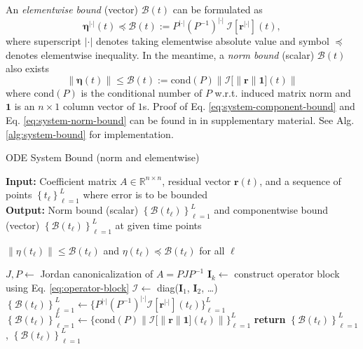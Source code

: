 \documentclass{uai2023}
\newcommand{\vect}[1]{\mathbf{#1}}
\newcommand{\Err}{\eta}
\newcommand{\Bound}{\mathcal{B}}
\newcommand{\I}{\mathcal{I}}
\newcommand{\abs}{|\cdot|}
\begin{document}
    An \textit{elementwise bound} (vector) $\pmb{\Bound}(t)$ can be formulated as 
    {
        \small
        \begin{equation}\label{eq:system-component-bound}
            \pmb{\Err}^{\abs}(t) \preceq \pmb{\Bound}(t) := P^{\abs} (P^{-1})^{\abs} \ \pmb{\I}\left[\vect{r}^{\abs}\right](t),
        \end{equation}
    }
    where superscript $\abs$ denotes taking elementwise absolute value and symbol $\preceq$ denotes elementwise inequality. In the meantime, a \textit{norm bound} (scalar) $\Bound(t)$ also exists
    {
        \small
        \begin{equation}\label{eq:system-norm-bound}
            \left\|\pmb{\Err}(t)\right\| \leq \Bound(t) := \mathrm{cond}(P)\left\|\pmb{\I}\big[\|\vect{r}\|\vect{1}\big](t)\right\|
        \end{equation}
    }
    where $\mathrm{cond}(P)$ is the conditional number of $P$ w.r.t. induced matrix norm and $\vect{1}$ is an $n\times 1$ column vector of $1$s. Proof of Eq. \ref{eq:system-component-bound} and Eq. \ref{eq:system-norm-bound} can be found in in supplementary material.
    See Alg. \ref{alg:system-bound} for implementation.

    \begin{algorithm}
        \small
        \caption{ODE System Bound (norm and elementwise)}\label{alg:system-bound}
        \textbf{Input:} Coefficient matrix $A \in \mathbb{R}^{n\times n}$, residual vector $\vect{r}(t)$, and a sequence of points $\left\{t_\ell\right\}_{\ell=1}^{L}$ where error is to be bounded\\
        \textbf{Output:} Norm bound (scalar) $\left\{\Bound(t_\ell)\right\}_{\ell=1}^{L}$ and componentwise bound (vector) $\left\{\pmb{\Bound}(t_\ell)\right\}_{\ell=1}^{L}$ at given time points
        \begin{algorithmic}
            \Ensure $\|\Err(t_\ell)\| \leq \Bound(t_\ell)$ and $\Err(t_\ell) \preceq \pmb{\Bound}(t_\ell)$ for all $\ell$

            \State $J, P \gets $ Jordan canonicalization of $A = PJP^{-1}$
                \State $\vect{I}_k \gets$ construct operator block using Eq. \ref{eq:operator-block} 
            \EndFor
            \State $\pmb{\I} \gets$ diag($\vect{I}_1$, $\vect{I}_2$,  \dots)
            \State $\left\{\pmb{\Bound}(t_\ell)\right\}_{\ell=1}^{L} \gets \{P^{\abs} (P^{-1})^{\abs} \pmb{\I}[\vect{r}^{\abs}](t_\ell)\}_{\ell=1}^{L}$
            \State $\left\{\Bound(t_\ell)\right\}_{\ell=1}^{L} \gets \{\mathrm{cond}(P)\left\|\pmb{\I}\big[\|\vect{r}\|\vect{1}\big](t_\ell)\right\|\}_{\ell=1}^{L}$
            \State \textbf{return} $\left\{\Bound(t_\ell)\right\}_{\ell=1}^{L}$, $\left\{\pmb{\Bound}(t_\ell)\right\}_{\ell=1}^{L}$
        \end{algorithmic}
    \end{algorithm}
\end{document}
